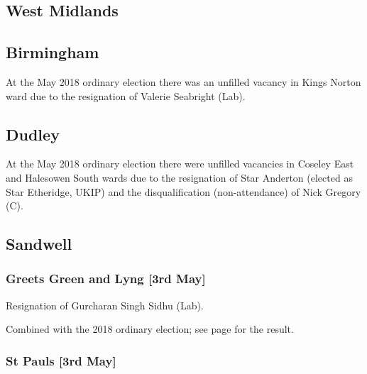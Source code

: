 \documentclass[a4paper,openany]{book}
\begin{document}
\begin{resultsiii}
\section{West Midlands}

\subsection*{Birmingham}

At the May 2018 ordinary election there was an unfilled vacancy in Kings Norton ward due to the resignation of Valerie Seabright (Lab).

\subsection*{Dudley}

At the May 2018 ordinary election there were unfilled vacancies in Coseley East and Halesowen South wards due to the resignation of Star Anderton (elected as Star Etheridge, UKIP) and the disqualification (non-attendance) of Nick Gregory (C).

\subsection*{Sandwell}

\subsubsection*{Greets Green and Lyng \hspace*{\fill}\nolinebreak[1]%
\enspace\hspace*{\fill}
[3rd May]}


Resignation of Gurcharan Singh Sidhu (Lab).

Combined with the 2018 ordinary election; see page \pageref{GreetsGreenLyngSandwell} for the result.

\subsubsection*{St Pauls \hspace*{\fill}\nolinebreak[1]%
\enspace\hspace*{\fill}
[3rd May]}


\end{resultsiii}
\end{document}
